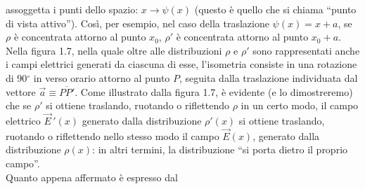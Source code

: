 assoggetta i punti dello spazio: $x\to\psi(x)$ (questo \`e quello che si chiama
``punto di vista attivo''). Cos\`i, per esempio, nel caso della traslazione
$\psi(x)=x+a$, se $\rho$ \`e concentrata attorno al punto $x_0$, $\rho'$ \`e
concentrata attorno al punto $x_0+a$. Nella figura 1.7, nella quale oltre alle
distribuzioni $\rho$ e $\rho'$ sono rappresentati anche i campi elettrici
generati da ciascuna di esse, l'isometria consiste in una rotazione di
90$^\circ$ in verso orario attorno al punto $P$, seguita dalla traslazione
individuata dal vettore $\vec a\equiv\overline{PP'}$.
Come illustrato dalla figura 1.7, \`e evidente (e lo dimostreremo) che se
$\rho'$ si ottiene traslando, ruotando o riflettendo $\rho$ in un certo modo, il
campo elettrico $\vec E\,'(x)$ generato dalla distribuzione $\rho'(x)$ si
ottiene traslando, ruotando o riflettendo nello stesso modo il campo
$\vec E(x)$, generato dalla distribuzione $\rho(x)$: in altri termini, la
distribuzione ``si porta dietro il proprio campo''.\\
Quanto appena affermato \`e espresso dal

